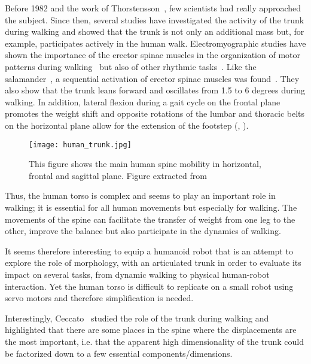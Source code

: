 Before 1982 and the work of Thorstensson~\parencite{thorstensson1982lumbar}, few scientists had really approached the subject. Since then, several studies have investigated the activity of the trunk during walking and showed that the trunk is not only an additional mass but, for example, participates actively in the human walk.
Electromyographic studies have shown the importance of the erector spinae muscles in the organization of motor patterns during walking~\parencite{anders2007trunk} but also of other rhythmic tasks~\parencite{de2008sequential}. Like the salamander~\parencite{ijspeert2007swimming}, a sequential activation of erector spinae muscles was found~\parencite{prince1994anticipatory}.
They also show that the trunk leans forward and oscillates from 1.5 to 6 degrees during walking. In addition, lateral flexion during a gait cycle on the frontal plane promotes the weight shift and opposite rotations of the lumbar and thoracic belts on the horizontal plane allow for the extension of the footstep (\cite{feipel2001three}, \cite{lamoth2006effects}).

\begin{figure}[ht]
    \begin{center}
        \texttt{[image: human\_trunk.jpg]}
    \end{center}
    \caption{This figure shows the main human spine mobility in horizontal, frontal and sagittal plane. Figure extracted from~\parencite{ceccatoPlos09}}
    \label{fig:human_spine_system}
\end{figure}

Thus, the human torso is complex and seems to play an important role in walking; it is essential for all human movements but especially for walking. The movements of the spine can facilitate the transfer of weight from one leg to the other, improve the balance but also participate in the dynamics of walking.

It seems therefore interesting to equip a humanoid robot that is an attempt to explore the role of morphology, with an articulated trunk in order to evaluate its impact on several tasks, from dynamic walking to physical human-robot interaction. Yet the human torso is difficult to replicate on a small robot using servo motors and therefore simplification is needed.

Interestingly, Ceccato~\parencite{ceccatoPlos09} studied the role of the trunk during walking and highlighted that there are some places in the spine where the displacements are the most important, i.e. that the apparent high dimensionality of the trunk could be factorized down to a few essential components/dimensions.

